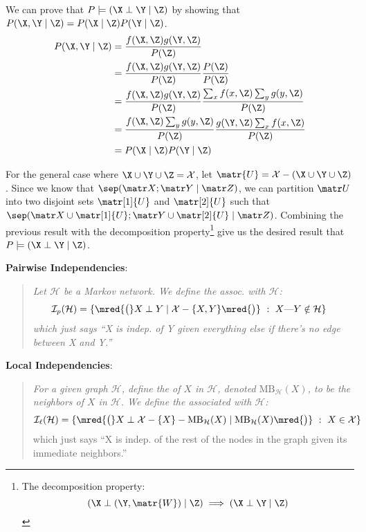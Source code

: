 \documentclass[11pt]{article}
\newcommand\myspace[1][]{\vspace{#1\bigskipamount}}
\newcommand\p{\Needspace{10\baselineskip} \noindent}
\begin{document}
\begin{compactitem}
\begin{example}[Proof]
\begin{compactitem}
		\item We can prove that $P \models (\X \perp \Y \mid \Z)$ by showing that $P(\X, \Y \mid \Z) = P(\X \mid \Z) P(\Y \mid \Z)$. 
		\begin{align}
			P(\X, \Y \mid \Z) &= \frac{f(\X, \Z) g(\Y, \Z)}{P(\Z)} \\
			&=  \frac{f(\X, \Z) g(\Y, \Z)}{P(\Z)} \frac{P(\Z)}{P(\Z)} \\
			&=  \frac{f(\X, \Z) g(\Y, \Z)}{P(\Z)} \frac{ \sum_x f(x, \Z) \sum_y g(y, \Z) }{ P(\Z) } \\
			&=  \frac{f(\X, \Z)  \sum_y g(y, \Z) }{P(\Z)} \frac{ g(\Y, \Z) \sum_x f(x, \Z)}{ P(\Z) } \\
			&= P(\X \mid \Z) P(\Y \mid \Z)
		\end{align} 
		
		\item For the general case where $\X \cup \Y \cup \Z = \mathcal{X}$, let $\matr{U} = \mathcal{X} - (\X \cup \Y \cup \Z )$. Since we know that $\sep (\matr X ; \matr Y \mid \matr Z)$, we can partition $\matr U$ into two disjoint sets $\matr[1]{U}$ and $\matr[2]{U}$ such that $\sep (\matr X \cup \matr[1]{U} ; \matr Y \cup \matr[2]{U}\mid \matr Z)$. Combining the previous result with the decomposition property\footnote{The decomposition property:$$(\X \perp (\Y, \matr{W}) \mid \Z) \implies (\X \perp \Y \mid \Z)$$} give us the desired result that $P \models (\X \perp \Y \mid \Z)$.
	\end{compactitem}
	\end{example}
\end{compactitem}

\myspace
\p \textbf{Pairwise Independencies}:
\vspace{-0.5em}
\begin{quote}
	{\itshape 
		Let $\mathcal H$ be a Markov network. We define the  assoc. with $\mathcal{H}$:
		\begin{align}
			\mathcal{I}_{p}(\mathcal H) &= \{ \mred{\big(} X \perp Y \mid \mathcal X  - \{X,Y\} \mred{\big)} ~ : ~ X\text{---}Y \notin \mathcal H  \}
		\end{align}
		which just says ``X is indep. of Y given everything else if there's no edge between X and Y.''
	}
\end{quote}

\newcommand\MB{\mathrm{MB}_{\mathcal H}}

\myspace
\p \textbf{Local Independencies}:
\vspace{-0.5em}
\begin{quote}
	{\itshape 
		For a given graph $\mathcal H$, define the  of $X$ in $\mathcal H$, denoted $\MB(X)$, to be the neighbors of $X$ in $\mathcal{H}$. We define the  associated with $\mathcal H$:
		\begin{align}
			\mathcal{I}_{\ell}(\mathcal H) &= \{ \mred{\big(}X \perp \mathcal X - \{X\}  - \MB(X) \mid \MB(X)  \mred{\big)}  ~ : ~ X \in \mathcal X   \}
		\end{align}
	}
	which just says ``X is indep. of the rest of the nodes in the graph given its immediate neighbors.''
\end{quote}
\end{document}
